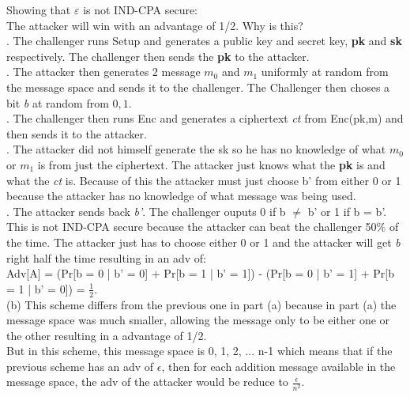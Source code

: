 \documentclass[10pt]{article}
\begin{document}
\indent Showing that $\varepsilon$  is not IND-CPA secure:\\

\indent The attacker will win with an advantage of 1/2. Why is this?\\

. The challenger runs Setup and generates a public key and secret key, \textbf{pk} and \textbf{sk} respectively. The challenger then sends the \textbf{pk} to the attacker.\\
. The attacker then generates 2 message $m_{0}$ and $m_{1}$ uniformly at random from the message space and sends it to the challenger. The Challenger then choses a bit \emph{b} at random from ${0,1}$.\\
. The challenger then runs Enc and generates a ciphertext \emph{ct} from Enc(pk,m) and then sends it to the attacker.\\
. The attacker did not himself generate the sk so he has no knowledge of what $m_{0}$ or $m_{1}$ is from just the ciphertext. The attacker just knows what the \textbf{pk} is and what the \emph{ct} is. Because of this the attacker must just choose b' from either 0 or 1 because the attacker has no knowledge of what message was being used.\\
. The attacker sends back \emph{b'}. The challenger ouputs 0 if b $\neq$ b' or 1 if b = b'.\\

\indent This is not IND-CPA secure because the attacker can beat the challenger 50\% of the time. The attacker just has to choose either 0 or 1 and the attacker will get \emph{b} right half the time resulting in an adv of:\\

\indent Adv[A] = (Pr[b = 0 | b' = 0] + Pr[b = 1 | b' = 1]) -  (Pr[b = 0 | b' = 1] + Pr[b = 1 | b' = 0]) = $\frac{1}{2}$.\\

(b) This scheme differs from the previous one in part (a) because in part (a) the message space was much smaller, allowing the message only to be either one or the other resulting in a advantage of 1/2.\\

\indent But in this scheme, this message space is {0, 1, 2, ... n-1} which means that if the previous scheme has an adv of $\epsilon$, then for each addition message available in the message space, the adv of the attacker would be reduce to $\frac{\epsilon}{n^{2}}$.\\
\end{document}

